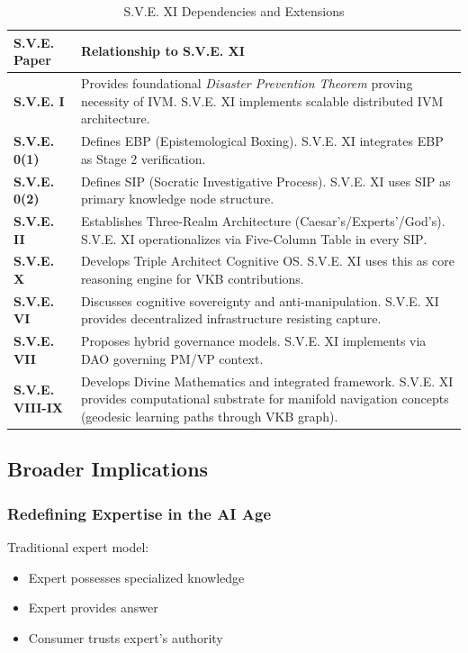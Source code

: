 \documentclass[11pt,a4paper]{article}
\theoremstyle{definition}
\theoremstyle{remark}
\newcommand{\VKB}{\textsc{VKB}}
\newcommand{\IVM}{\textsc{IVM}}
\newcommand{\SIP}{\textsc{SIP}}
\newcommand{\EBP}{\textsc{EBP}}
\newcommand{\DAO}{\textsc{DAO}}
\begin{document}
\begin{table}[H]
\centering
\caption{S.V.E. XI Dependencies and Extensions}
\begin{tabular}{@{}lp{9cm}@{}}
\toprule
\textbf{S.V.E. Paper} & \textbf{Relationship to S.V.E. XI} \\
\midrule
\textbf{S.V.E. I} & Provides foundational \textit{Disaster Prevention Theorem} proving necessity of \IVM{}. S.V.E. XI implements scalable distributed \IVM{} architecture. \\
\textbf{S.V.E. 0(1)} & Defines \EBP{} (Epistemological Boxing). S.V.E. XI integrates \EBP{} as Stage 2 verification. \\
\textbf{S.V.E. 0(2)} & Defines \SIP{} (Socratic Investigative Process). S.V.E. XI uses \SIP{} as primary knowledge node structure. \\
\textbf{S.V.E. II} & Establishes Three-Realm Architecture (Caesar's/Experts'/God's). S.V.E. XI operationalizes via Five-Column Table in every \SIP{}. \\
\textbf{S.V.E. X} & Develops Triple Architect Cognitive OS. S.V.E. XI uses this as core reasoning engine for \VKB{} contributions. \\
\textbf{S.V.E. VI} & Discusses cognitive sovereignty and anti-manipulation. S.V.E. XI provides decentralized infrastructure resisting capture. \\
\textbf{S.V.E. VII} & Proposes hybrid governance models. S.V.E. XI implements via \DAO{} governing PM/VP context. \\
\textbf{S.V.E. VIII-IX} & Develops Divine Mathematics and integrated framework. S.V.E. XI provides computational substrate for manifold navigation concepts (geodesic learning paths through \VKB{} graph). \\
\bottomrule
\end{tabular}
\end{table}

\subsection{Broader Implications}

\subsubsection{Redefining Expertise in the AI Age}

Traditional expert model:
\begin{itemize}
    \item Expert possesses specialized knowledge
    \item Expert provides answer
    \item Consumer trusts expert's authority
\end{itemize}
\end{document}
